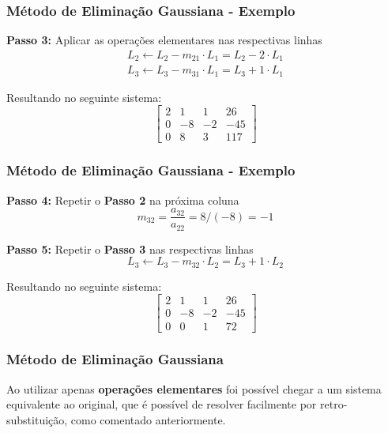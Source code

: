 \documentclass{beamer}
\theoremstyle{mystyle}
\begin{document}
\begin{frame}
	\frametitle{Método de Eliminação Gaussiana - Exemplo}
	\textbf{Passo 3:} Aplicar as operações elementares nas respectivas linhas
	\begin{gather*}
		L_{2} \leftarrow L_{2} - m_{21}\cdot L_{1} = L_{2} - 2\cdot L_{1}\\
		L_{3} \leftarrow L_{3} - m_{31}\cdot L_{1} = L_{3} + 1\cdot L_{1}
	\end{gather*}

	Resultando no seguinte sistema:
	\begin{equation*}
		\left[
		\begin{array}{ccc|c}
			2  & 1  & 1 & 26 \\
			0  & -8 & -2 & -45  \\
			0  &  8 & 3 & 117
		\end{array}
		\right]
	\end{equation*}
\end{frame}

\begin{frame}
	\frametitle{Método de Eliminação Gaussiana - Exemplo}
	\textbf{Passo 4:} Repetir o \textbf{Passo 2} na próxima coluna
	\begin{equation*}
		m_{32} = \dfrac{a_{32}}{a_{22}} = 8/(-8) = -1
	\end{equation*}
	
	\textbf{Passo 5:} Repetir o \textbf{Passo 3} nas respectivas linhas
	\begin{equation*}
		L_{3} \leftarrow L_{3} - m_{32}\cdot L_{2} = L_{3} + 1\cdot L_{2}
	\end{equation*}
	
	Resultando no seguinte sistema:
	\begin{equation*}
		\left[
		\begin{array}{ccc|c}
			2  & 1  & 1 & 26 \\
			0  & -8 & -2 & -45  \\
			0  &  0 & 1 & 72
		\end{array}
		\right]
	\end{equation*}
\end{frame}

\begin{frame}
	\frametitle{Método de Eliminação Gaussiana}
	Ao utilizar apenas \textbf{operações elementares} foi possível chegar a um sistema equivalente ao original, que é possível de resolver facilmente por retro-substituição, como comentado anteriormente.
\end{frame}
\end{document}
